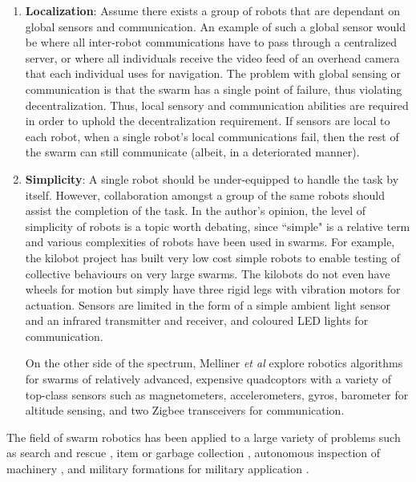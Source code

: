 \begin{enumerate}
\item \textbf{Localization}: Assume there exists a group of robots that are dependant on global sensors and communication. An example of such a global sensor would be where all inter-robot communications have to pass through a centralized server, or where all individuals receive the video feed of an overhead camera that each individual uses for navigation. The problem with global sensing or communication is that the swarm has a single point of failure, thus violating decentralization. Thus, local sensory and communication abilities are required in order to uphold the decentralization requirement. If sensors are local to each robot, when a single robot's local communications fail, then the rest of the swarm can still communicate (albeit, in a deteriorated manner).

\item \textbf{Simplicity}: A single robot should be under-equipped to handle the task by itself. However, collaboration amongst a group of the same robots should assist the completion of the task. In the author's opinion, the level of simplicity of robots is a topic worth debating, since ``simple" is a relative term and various complexities of robots have been used in swarms. For example, the kilobot project \cite{rubenstein2012kilobot} has built very low cost simple robots to enable testing of collective behaviours on very large swarms. The kilobots do not even have wheels for motion but simply have three rigid legs with vibration motors for actuation. Sensors are limited in the form of a simple ambient light sensor and an infrared transmitter and receiver, and coloured LED lights for communication. 

On the other side of the spectrum, Melliner \textit{et al} \cite{kushleyev2013towards, mellinger2013cooperative} explore robotics algorithms for swarms of relatively advanced, expensive quadcoptors with a variety of top-class sensors such as magnetometers, accelerometers, gyros, barometer for altitude sensing, and two Zigbee transceivers for communication.
\end{enumerate}

 The field of swarm robotics has been applied to a large variety of problems such as search and rescue \cite{mondada2002search}, item or garbage collection \cite{balch1995io}, autonomous inspection of machinery \cite{correll2007challenging}, and military formations for military application \cite{balch1998behavior}.



